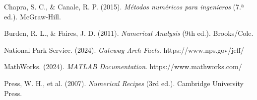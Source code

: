 \documentclass[conference]{IEEEtran}
\begin{document}
\begin{thebibliography}{00}
 Chapra, S. C., \& Canale, R. P. (2015). \textit{Métodos numéricos para ingenieros} (7.ª ed.). McGraw-Hill.

 Burden, R. L., \& Faires, J. D. (2011). \textit{Numerical Analysis} (9th ed.). Brooks/Cole.

 National Park Service. (2024). \textit{Gateway Arch Facts}. https://www.nps.gov/jeff/

 MathWorks. (2024). \textit{MATLAB Documentation}. https://www.mathworks.com/

 Press, W. H., et al. (2007). \textit{Numerical Recipes} (3rd ed.). Cambridge University Press.
\end{thebibliography}
\end{document}
